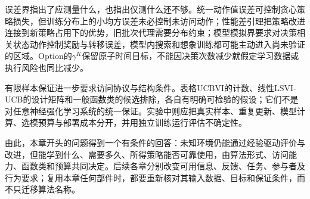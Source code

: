 误差界指出了应测量什么，也指出仅测什么还不够。统一动作值误差可控制贪心策略损失，但训练分布上的小均方误差未必控制未访问动作；性能差引理把策略改进连接到新策略占用下的优势，旧批次代理需要分布约束；模型模拟界要求对决策相关状态动作控制奖励与转移误差，模型内搜索和想象训练都可能主动进入尚未验证的区域。Option的$\gamma^K$保留原子时间目标，不能因决策次数减少就假定学习数据或执行风险也同比减少。

有限样本保证进一步要求访问协议与结构条件。表格UCBVI的计数、线性LSVI-UCB的设计矩阵和一般函数类的候选排除，各自有明确可检验的假设；它们不是对任意神经强化学习系统的统一保证。实验中则应把真实样本、重复更新、模型计算、选模预算与部署成本分开，并用独立训练运行评估不确定性。

由此，本章开头的问题得到一个有条件的回答：未知环境仍能通过经验驱动评价与改进，但能学到什么、需要多久、所得策略能否可靠使用，由算法形式、访问能力、函数类和预算共同决定。后续各章分别改变可用信息、反馈、任务、参与者及行为要求；复用本章任何部件时，都要重新核对其输入数据、目标和保证条件，而不只迁移算法名称。
